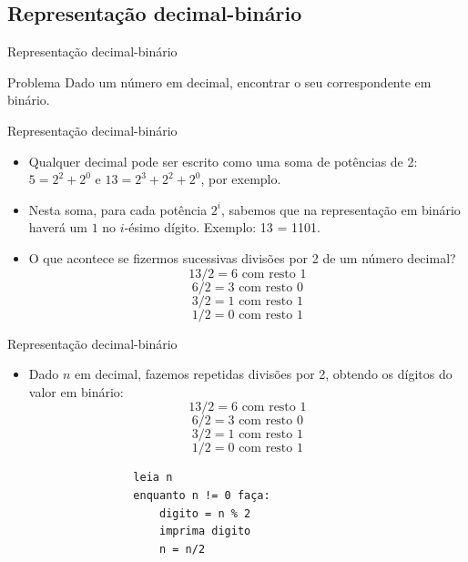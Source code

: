 \documentclass[handout]{beamer}
\begin{document}
\subsection{Representação decimal-binário}%

\begin{frame}[fragile]{Representação decimal-binário}
    \begin{block}{Problema}
        Dado um número em decimal, encontrar o seu correspondente em binário.
    \end{block}
\end{frame}
    
\begin{frame}[fragile]{Representação decimal-binário}
    \begin{itemize}[<+->]
        \item Qualquer decimal pode ser escrito como uma soma de potências de 2: $5 = 2^2 + 2^0$ e $13 = 2^3 + 2^2 + 2^0$, por exemplo.
        \item Nesta soma, para cada potência $2^i$, sabemos que na representação em binário haverá um $1$ no $i$-ésimo dígito. Exemplo: 13 = 1101.
        \item O que acontece se fizermos sucessivas divisões por 2 de um número decimal?
        $$13/2 = 6 \mbox{ com resto } 1$$
        $$6/2 = 3 \mbox{ com resto } 0$$
        $$3/2 = 1 \mbox{ com resto } 1$$
        $$1/2 = 0 \mbox{ com resto } 1$$
    \end{itemize}
\end{frame}

\begin{frame}[fragile]{Representação decimal-binário}

    \begin{itemize}
        \item Dado $n$ em decimal, fazemos repetidas divisões por 2, obtendo os dígitos do valor em binário:
            $$13/2 = 6 \mbox{ com resto } 1$$
            $$6/2 = 3 \mbox{ com resto } 0$$
            $$3/2 = 1 \mbox{ com resto } 1$$
            $$1/2 = 0 \mbox{ com resto } 1$$

            \begin{verbatim}
                leia n
                enquanto n != 0 faça:
                    digito = n % 2
                    imprima digito
                    n = n/2
            \end{verbatim}
    \end{itemize}
\end{frame}
\end{document}
